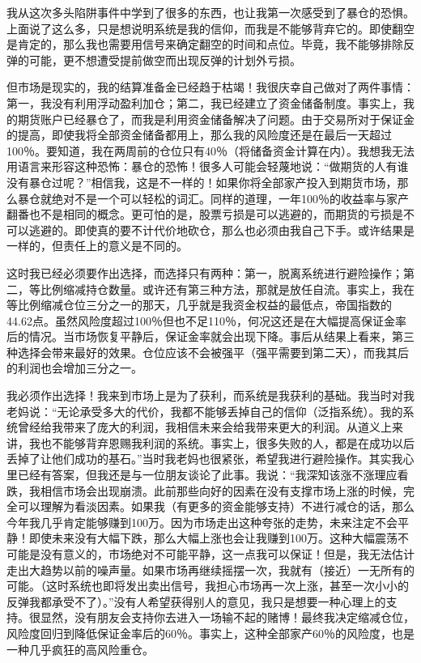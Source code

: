 我从这次多头陷阱事件中学到了很多的东西，也让我第一次感受到了暴仓的恐惧。上面说了这么多，只是想说明系统是我的信仰，而我是不能够背弃它的。即使翻空是肯定的，那么我也需要用信号来确定翻空的时间和点位。毕竟，我不能够排除反弹的可能，更不想遭受提前做空而出现反弹的计划外亏损。

但市场是现实的，我的结算准备金已经趋于枯竭！我很庆幸自己做对了两件事情：第一，我没有利用浮动盈利加仓；第二，我已经建立了资金储备制度。事实上，我的期货账户已经暴仓了，而我是利用资金储备解决了问题。由于交易所对于保证金的提高，即使我将全部资金储备都用上，那么我的风险度还是在最后一天超过100％。要知道，我在两周前的仓位只有40％（将储备资金计算在内）。我想我无法用语言来形容这种恐怖：暴仓的恐怖！很多人可能会轻蔑地说：“做期货的人有谁没有暴仓过呢？”相信我，这是不一样的！如果你将全部家产投入到期货市场，那么暴仓就绝对不是一个可以轻松的词汇。同样的道理，一年100％的收益率与家产翻番也不是相同的概念。更可怕的是，股票亏损是可以逃避的，而期货的亏损是不可以逃避的。即使真的要不计代价地砍仓，那么也必须由我自己下手。或许结果是一样的，但责任上的意义是不同的。

这时我已经必须要作出选择，而选择只有两种：第一，脱离系统进行避险操作；第二，等比例缩减持仓数量。或许还有第三种方法，那就是放任自流。事实上，我在等比例缩减仓位三分之一的那天，几乎就是我资金权益的最低点，帝国指数的44.62点。虽然风险度超过100％但也不足110％，何况这还是在大幅提高保证金率后的情况。当市场恢复平静后，保证金率就会出现下降。事后从结果上看来，第三种选择会带来最好的效果。仓位应该不会被强平（强平需要到第二天），而我其后的利润也会增加三分之一。

我必须作出选择！我来到市场上是为了获利，而系统是我获利的基础。我当时对我老妈说：“无论承受多大的代价，我都不能够丢掉自己的信仰（泛指系统）。我的系统曾经给我带来了庞大的利润，我相信未来会给我带来更大的利润。从道义上来讲，我也不能够背弃恩赐我利润的系统。事实上，很多失败的人，都是在成功以后丢掉了让他们成功的基石。”当时我老妈也很紧张，希望我进行避险操作。其实我心里已经有答案，但我还是与一位朋友谈论了此事。我说：“我深知该涨不涨理应看跌，我相信市场会出现崩溃。此前那些向好的因素在没有支撑市场上涨的时候，完全可以理解为看淡因素。如果我（有更多的资金能够支持）不进行减仓的话，那么今年我几乎肯定能够赚到100万。因为市场走出这种夸张的走势，未来注定不会平静！即使未来没有大幅下跌，那么大幅上涨也会让我赚到100万。这种大幅震荡不可能是没有意义的，市场绝对不可能平静，这一点我可以保证！但是，我无法估计走出大趋势以前的噪声量。如果市场再继续摇摆一次，我就有（接近）一无所有的可能。（这时系统也即将发出卖出信号，我担心市场再一次上涨，甚至一次小小的反弹我都承受不了）。”没有人希望获得别人的意见，我只是想要一种心理上的支持。很显然，没有朋友会支持你去进入一场输不起的赌博！最终我决定缩减仓位，风险度回归到降低保证金率后的60％。事实上，这种全部家产60％的风险度，也是一种几乎疯狂的高风险重仓。

